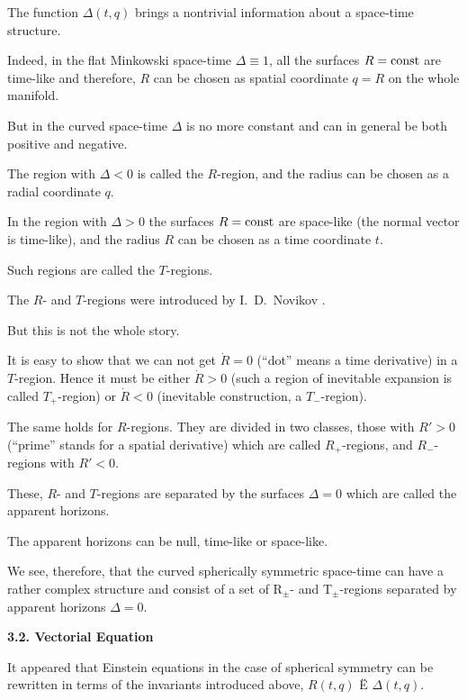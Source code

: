 The function $\Delta (t, q)$ brings a nontrivial information about a space-time struc\-ture. 

Indeed, in the flat Minkowski space-time $\Delta \equiv 1$, all the surfaces $R = \rm const$ are time-like and therefore, $R$ can be chosen as spatial coordinate $q = R$ on the whole manifold.

But in the curved space-time $\Delta$ is no more constant and can in general be both positive and negative. 

The region with $\Delta < 0$ is called the $R$-region, and the radius can be chosen as a radial coordinate $q$.

In the region with $\Delta > 0$ the surfaces $R = \rm const$ are space-like (the normal vector is time-like), and the radius $R$ can be chosen as a time coordinate $t$. 

Such regions are called the $T$-regions. 

The $R$- and $T$-regions were introduced by I.~D.~Novikov \cite{berez:Novrt}.

But this is not the whole story. 

It is easy to show that we can not get $\dot R = 0$ (``dot'' means a time derivative) in a $T$-region. Hence it must be either $\dot R > 0$ (such a region of inevitable expansion is called $T_+$-region) or $\dot R < 0$ (inevitable construction, a $T_-$-region). 

The same holds for $R$-regions. They are divided in two classes, those with $R' > 0$ (``prime'' stands for a spatial derivative) which are called $R_+$-regions, and $R_-$-regions with $R' < 0$. 

These, $R$- and $T$-regions are separated by the surfaces $\Delta = 0$ which are called the apparent horizons. 

The apparent horizons can be null, time-like or space-like. 

We see, therefore, that the curved spherically symmetric space-time can have a rather complex structure and consist of a set of R$_\pm$- and T$_\pm$-regions separated by apparent horizons $\Delta=0$.



\smallskip



\textbf{3.2. Vectorial Equation}

It appeared that Einstein equations in the case of spherical symmetry can be rewritten in terms of the invariants introduced above, $R(t,q)$ Ë $\Delta (t,q)$. 

